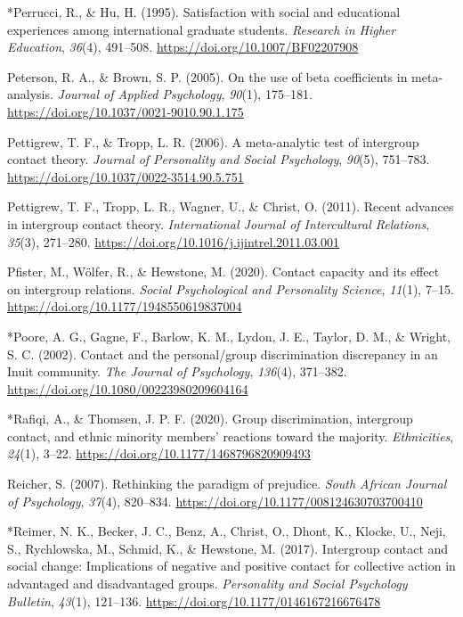 \documentclass[12pt, letterpaper]{article}
\begin{document}
\leavevmode\hypertarget{ref-823}{}%
*Perrucci, R., \& Hu, H. (1995). Satisfaction with social and
educational experiences among international graduate students.
\emph{Research in Higher Education}, \emph{36}(4), 491--508.
\url{https://doi.org/10.1007/BF02207908}

\leavevmode\hypertarget{ref-peterson_use_2005}{}%
Peterson, R. A., \& Brown, S. P. (2005). On the use of beta coefficients
in meta-analysis. \emph{Journal of Applied Psychology}, \emph{90}(1),
175--181. \url{https://doi.org/10.1037/0021-9010.90.1.175}

\leavevmode\hypertarget{ref-pettigrew_meta-analytic_2006}{}%
Pettigrew, T. F., \& Tropp, L. R. (2006). A meta-analytic test of
intergroup contact theory. \emph{Journal of Personality and Social
Psychology}, \emph{90}(5), 751--783.
\url{https://doi.org/10.1037/0022-3514.90.5.751}

\leavevmode\hypertarget{ref-pettigrew_recent_2011}{}%
Pettigrew, T. F., Tropp, L. R., Wagner, U., \& Christ, O. (2011). Recent
advances in intergroup contact theory. \emph{International Journal of
Intercultural Relations}, \emph{35}(3), 271--280.
\url{https://doi.org/10.1016/j.ijintrel.2011.03.001}

\leavevmode\hypertarget{ref-pfister_contact_2020}{}%
Pfister, M., Wölfer, R., \& Hewstone, M. (2020). Contact capacity and
its effect on intergroup relations. \emph{Social Psychological and
Personality Science}, \emph{11}(1), 7--15.
\url{https://doi.org/10.1177/1948550619837004}

\leavevmode\hypertarget{ref-1762}{}%
*Poore, A. G., Gagne, F., Barlow, K. M., Lydon, J. E., Taylor, D. M., \&
Wright, S. C. (2002). Contact and the personal/group discrimination
discrepancy in an Inuit community. \emph{The Journal of Psychology},
\emph{136}(4), 371--382. \url{https://doi.org/10.1080/00223980209604164}

\leavevmode\hypertarget{ref-3051}{}%
*Rafiqi, A., \& Thomsen, J. P. F. (2020). Group discrimination,
intergroup contact, and ethnic minority members' reactions toward the
majority. \emph{Ethnicities}, \emph{24}(1), 3--22.
\url{https://doi.org/10.1177/1468796820909493}

\leavevmode\hypertarget{ref-reicher_rethinking_2007}{}%
Reicher, S. (2007). Rethinking the paradigm of prejudice. \emph{South
African Journal of Psychology}, \emph{37}(4), 820--834.
\url{https://doi.org/10.1177/008124630703700410}

\leavevmode\hypertarget{ref-956}{}%
*Reimer, N. K., Becker, J. C., Benz, A., Christ, O., Dhont, K., Klocke,
U., Neji, S., Rychlowska, M., Schmid, K., \& Hewstone, M. (2017).
Intergroup contact and social change: Implications of negative and
positive contact for collective action in advantaged and disadvantaged
groups. \emph{Personality and Social Psychology Bulletin}, \emph{43}(1),
121--136. \url{https://doi.org/10.1177/0146167216676478}
\end{document}
